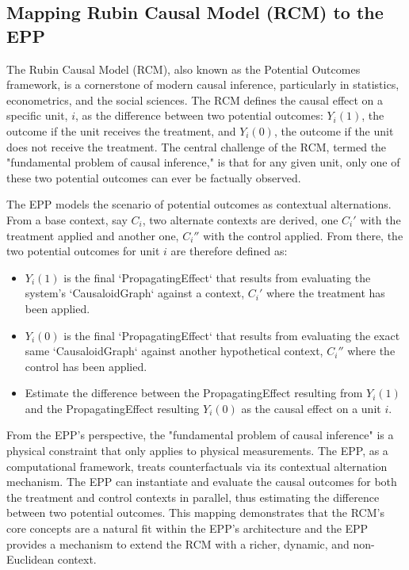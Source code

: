 %
%
\subsection{Mapping Rubin Causal Model (RCM) to the EPP}
\label{sec:epp_rubin_causal_model}

The Rubin Causal Model (RCM), also known as the Potential Outcomes framework, is a cornerstone of modern causal inference, particularly in statistics, econometrics, and the social sciences. The RCM defines the causal effect on a specific unit, $i$, as the difference between two potential outcomes: $Y_{i}(1)$, the outcome if the unit receives the treatment, and $Y_{i}(0)$,  the outcome if the unit does not receive the treatment. The central challenge of the RCM, termed the "fundamental problem of causal inference," is that for any given unit, only one of these two potential outcomes can ever be factually observed.  

The EPP models the scenario of potential outcomes as contextual alternations. From a base context, say $C_i$, two alternate contexts are derived, one $C_i'$  with the treatment applied and another one,  $C_i''$ with the control applied. From there, the two potential outcomes for unit $i$ are therefore defined as:

\begin{itemize}
	\item  $Y_i(1)$ is the final `PropagatingEffect` that results from evaluating the system's `CausaloidGraph` against a context, $C_i'$ where the treatment has been applied.
	\item $Y_i(0)$ is the final `PropagatingEffect` that results from evaluating the exact same `CausaloidGraph` against another hypothetical context, $C_i''$ where the control has been applied.
	\item Estimate the difference between the PropagatingEffect resulting from $Y_i(1)$  and the PropagatingEffect resulting $Y_i(0)$ as the causal effect on a unit $i$. 
\end{itemize}

From the EPP's perspective, the "fundamental problem of causal inference" is a physical constraint that only applies to physical measurements. The EPP, as a computational framework, treats counterfactuals via its contextual alternation mechanism. The EPP can instantiate and evaluate the causal outcomes for both the treatment and control contexts in parallel, thus estimating the difference between two potential outcomes. This mapping demonstrates that the RCM's core concepts are a natural fit within the EPP's architecture and the EPP provides a mechanism to extend the RCM with a richer, dynamic, and non-Euclidean context.

